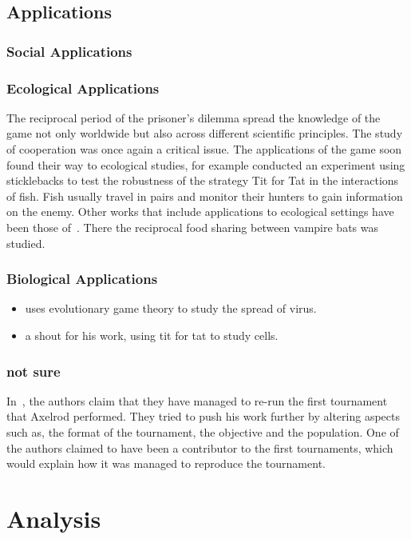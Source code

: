 \documentclass{article}
\begin{document}
\subsection{Applications}

\subsubsection{Social Applications}

\subsubsection{Ecological Applications}

The reciprocal period of the prisoner's dilemma spread the knowledge of the
game not only worldwide but also across different scientific principles. The
study of cooperation was once again a critical issue. The applications of
the game soon found their way to ecological studies, for example 
\cite{Milinski1987} conducted an experiment using sticklebacks to test
the robustness of the strategy Tit for Tat in the interactions of fish. Fish usually
travel in pairs and monitor their hunters to gain information on the enemy.
Other works that include applications to ecological settings have been those
of~\cite{Godfray1992, Wilkinson1984}. There the reciprocal food sharing
between vampire bats was studied.

\subsubsection{Biological Applications}
\begin{itemize}
    \item \cite{Turner1999} uses evolutionary game theory to study the spread of
    virus.
    \item \cite{Douglas2011} a shout for his work, using tit for tat to study cells.
\end{itemize}
\subsubsection{not sure}
In~\cite{Rapoport2015}, the authors claim that they have managed to 
re-run the first tournament that Axelrod performed. They tried to push his work
further by altering aspects such as, the format of the tournament, the objective
and the population. One of the authors claimed to have been a contributor
to the first tournaments, which would explain how it was managed to reproduce
the tournament.

\section{Analysis}\label{section:analysis}



\end{document}
